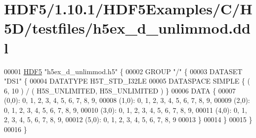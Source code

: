 \hypertarget{_h_d_f5_21_810_81_2_h_d_f5_examples_2_c_2_h5_d_2testfiles_2h5ex__d__unlimmod_8ddl_source}{}\section{H\+D\+F5/1.10.1/\+H\+D\+F5\+Examples/\+C/\+H5\+D/testfiles/h5ex\+\_\+d\+\_\+unlimmod.ddl}
\label{_h_d_f5_21_810_81_2_h_d_f5_examples_2_c_2_h5_d_2testfiles_2h5ex__d__unlimmod_8ddl_source}

\begin{DoxyCode}
00001 \hyperlink{namespace_h_d_f5}{HDF5} \textcolor{stringliteral}{"h5ex\_d\_unlimmod.h5"} \{
00002 GROUP \textcolor{stringliteral}{"/"} \{
00003    DATASET \textcolor{stringliteral}{"DS1"} \{
00004       DATATYPE  H5T\_STD\_I32LE
00005       DATASPACE  SIMPLE \{ ( 6, 10 ) / ( H5S\_UNLIMITED, H5S\_UNLIMITED ) \}
00006       DATA \{
00007       (0,0): 0, 1, 2, 3, 4, 5, 6, 7, 8, 9,
00008       (1,0): 0, 1, 2, 3, 4, 5, 6, 7, 8, 9,
00009       (2,0): 0, 1, 2, 3, 4, 5, 6, 7, 8, 9,
00010       (3,0): 0, 1, 2, 3, 4, 5, 6, 7, 8, 9,
00011       (4,0): 0, 1, 2, 3, 4, 5, 6, 7, 8, 9,
00012       (5,0): 0, 1, 2, 3, 4, 5, 6, 7, 8, 9
00013       \}
00014    \}
00015 \}
00016 \}
\end{DoxyCode}
